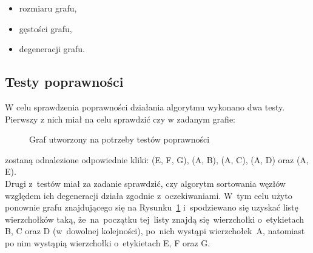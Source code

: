 \documentclass[11pt,a4paper]{article}
\begin{document}
\begin{itemize}
  \item rozmiaru grafu,
  \item gęstości grafu,
  \item degeneracji grafu.
\end{itemize}

\subsection{Testy poprawności}
W celu sprawdzenia poprawności działania algorytmu wykonano dwa testy.
Pierwszy z nich miał na celu sprawdzić czy w zadanym grafie:

\begin{figure}[H]
  \centering
  \caption{Graf utworzony na potrzeby testów poprawności}
  \label{figure:testGraph}
\end{figure}

zostaną odnalezione odpowiednie kliki: (E, F, G), (A, B), (A, C), (A, D) oraz (A, E).\\

Drugi z~testów miał za zadanie sprawdzić, czy algorytm sortowania węzłów względem ich degeneracji działa zgodnie z~oczekiwaniami.  W~tym celu użyto ponownie grafu znajdującego się na Rysunku~\ref{figure:testGraph} i~spodziewano się uzyskać listę wierzchołków taką, że~na~początku tej~listy znajdą się~wierzchołki o~etykietach B, C oraz D (w~dowolnej kolejności), po~nich wystąpi wierzchołek~A, natomiast po nim wystąpią wierzchołki o~etykietach E, F oraz G.\\
\end{document}
